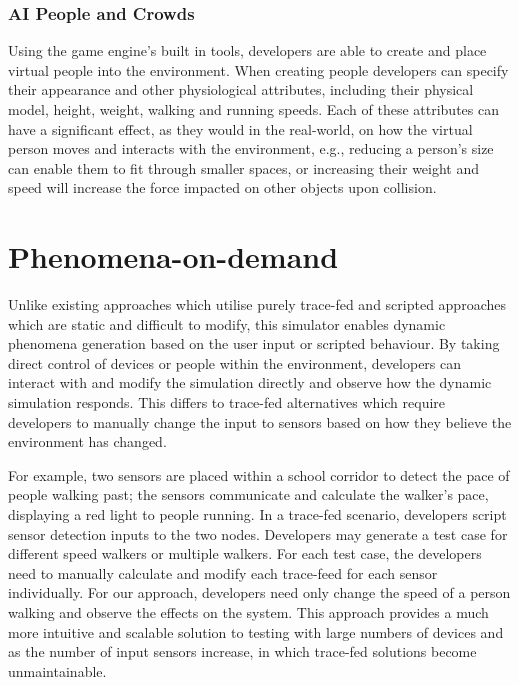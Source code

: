 \subsubsection{AI People and Crowds} %
\label{ssub:ai_people_and_crowds}
Using the game engine's built in tools, developers are able to create and place virtual people into the environment. When creating people developers can specify their appearance and other physiological attributes, including their physical model, height, weight, walking and running speeds. Each of these attributes can have a significant effect, as they would in the real-world, on how the virtual person moves and interacts with the environment, e.g., reducing a person's size can enable them to fit through smaller spaces, or increasing their weight and speed will increase the force impacted on other objects upon collision.




\section{Phenomena-on-demand} %
\label{sec:phenomena_on_demand}
Unlike existing approaches which utilise purely trace-fed and scripted approaches which are static and difficult to modify, this simulator enables dynamic phenomena generation based on the user input or scripted behaviour. 
By taking direct control of devices or people within the environment, developers can interact with and modify the simulation directly and observe how the dynamic simulation responds. This differs to trace-fed alternatives which require developers to manually change the input to sensors based on how they believe the environment has changed. 

For example, two sensors are placed within a school corridor to detect the pace of people walking past; the sensors communicate and calculate the walker's pace, displaying a red light to people running. In a trace-fed scenario, developers script sensor detection inputs to the two nodes. Developers may generate a test case for different speed walkers or multiple walkers. For each test case, the developers need to manually calculate and modify each trace-feed for each sensor individually. For our approach, developers need only change the speed of a person walking and observe the effects on the system. This approach provides a much more intuitive and scalable solution to testing with large numbers of devices and as the number of input sensors increase, in which trace-fed solutions become unmaintainable.  

